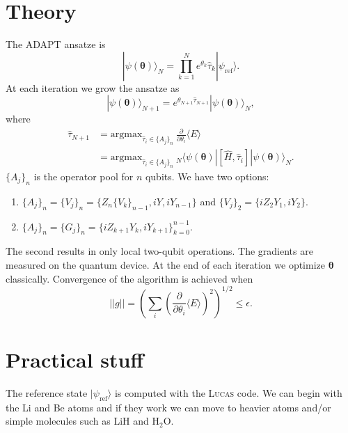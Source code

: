 \documentclass[english,a4paper,12pt]{article}
\title{}
\author{}
\date{}
\begin{document}
\pagestyle{empty}

\section*{Theory}

\noindent The ADAPT ansatze is
%
\begin{equation}
|\psi(\mathbf{\theta})\rangle_N=\prod_{k=1}^{N}e^{\theta_k}\hat{\tau}_k|\psi_\mathrm{ref}\rangle.
\end{equation}
%
At each iteration we grow the ansatze as
%
\begin{equation}
|\psi(\mathbf{\theta})\rangle_{N+1}=e^{\theta_{N+1}\hat{\tau}_{N+1}}|\psi(\mathbf{\theta})\rangle_N,
\end{equation}
%
where
%
\begin{equation}
\begin{split}
\hat{\tau}_{N+1}&=\text{argmax}_{\hat{\tau}_i\in\{A_j\}_n}\ \frac{\partial}{\partial\theta_i}\langle E\rangle \\
&=\text{argmax}_{\hat{\tau}_i\in\{A_j\}_n}\ _N\langle\psi(\mathbf{\theta})|[\hat{H},\hat{\tau}_i]|\psi(\mathbf{\theta})\rangle_N.
\end{split}
\end{equation}
%
$\{A_j\}_n$ is the operator pool for $n$ qubits.
We have two options:
%
\begin{enumerate}
\item $\{A_j\}_n=\{V_j\}_n=\{Z_n\{V_k\}_{n-1}, iY, iY_{n-1}\}$ and $\{V_j\}_2=\{iZ_2Y_1,iY_2\}$.
\item $\{A_j\}_n=\{G_j\}_n=\{iZ_{k+1}Y_k,iY_{k+1}\}_{k=0}^{n-1}$.
\end{enumerate}
%
The second results in only local two-qubit operations.
The gradients are measured on the quantum device.
At the end of each iteration we optimize $\mathbf{\theta}$ classically.
Convergence of the algorithm is achieved when
%
\begin{equation}
\vert\vert g\vert\vert=\left(\sum_i\left(\frac{\partial}{\partial\theta_i}\langle E\rangle\right)^2\right)^{1/2}\leq\epsilon.
\end{equation}
%

\section*{Practical stuff}

The reference state $|\psi_\mathrm{ref}\rangle$ is computed with the \textsc{Lucas} code.
We can begin with the Li and Be atoms and if they work we can move to heavier atoms and/or simple molecules such as LiH and H$_2$O.
\end{document}
